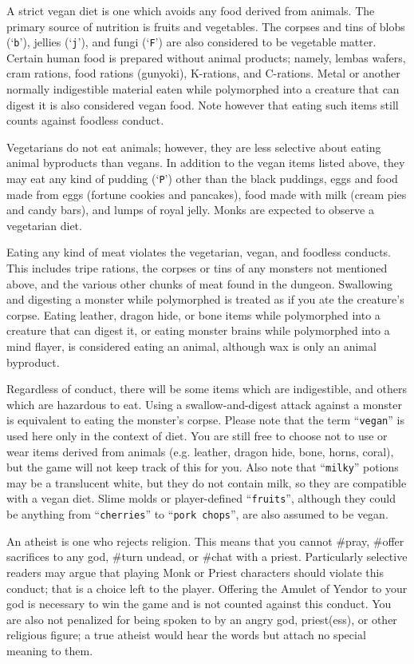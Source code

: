 A strict vegan diet is one which avoids any food derived from animals.
The primary source of nutrition is fruits and vegetables.  The
corpses and tins of blobs (`{\tt b}'), jellies (`{\tt j}'), and fungi (`{\tt F}') are
also considered to be vegetable matter.  Certain human
food is prepared without animal products; namely, lembas wafers, cram
rations, food rations (gunyoki), K-rations, and C-rations.
Metal or another normally indigestible material eaten while polymorphed
into a creature that can digest it is also considered vegan food.
Note however that eating such items still counts against foodless conduct.

Vegetarians do not eat animals;
however, they are less selective about eating animal byproducts than vegans.
In addition to the vegan items listed above, they may eat any kind
of pudding (`{\tt P}') other than the black puddings,
eggs and food made from eggs (fortune cookies and pancakes),
food made with milk (cream pies and candy bars), and lumps of
royal jelly.  Monks are expected to observe a vegetarian diet.

Eating any kind of meat violates the vegetarian, vegan, and foodless
conducts.  This includes tripe rations, the corpses or tins of any
monsters not mentioned above, and the various other chunks of meat
found in the dungeon.  Swallowing and digesting a monster while polymorphed
is treated as if you ate the creature's corpse.
Eating leather, dragon hide, or bone items while
polymorphed into a creature that can digest it, or eating monster brains
while polymorphed into a mind flayer, is considered eating
an animal, although wax is only an animal byproduct.

Regardless of conduct, there will be some items which are indigestible,
and others which are hazardous to eat.  Using a swallow-and-digest
attack against a monster is equivalent to eating the monster's corpse.
Please note that the term ``{\tt vegan}'' is used here only in the context of
diet.  You are still free to choose not to use or wear items derived
from animals (e.g. leather, dragon hide, bone, horns, coral), but the
game will not keep track of this for you.  Also note that ``{\tt milky}''
potions may be a translucent white, but they do not contain milk,
so they are compatible with a vegan diet.  Slime molds or
player-defined ``{\tt fruits}'', although they could be anything
from ``{\tt cherries}'' to ``{\tt pork chops}'', are also assumed to be vegan.

An atheist is one who rejects religion.  This means that you cannot
\#pray, \#offer sacrifices to any god, \#turn undead, or \#chat with a priest.
Particularly selective readers may argue that playing Monk or Priest
characters should violate this conduct; that is a choice left to the
player.  Offering the Amulet of Yendor to your god is necessary to
win the game and is not counted against this conduct.  You are also
not penalized for being spoken to by an angry god, priest(ess), or
other religious figure; a true atheist would hear the words but
attach no special meaning to them.

